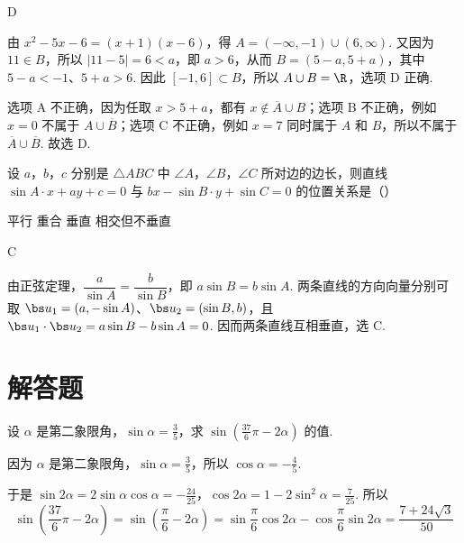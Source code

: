 \begin{answer}
D
\end{answer}

\begin{solution}
由 \(x^2-5x-6=(x+1)(x-6)\)，得 \(A=(-\infty,-1)\cup(6,\infty)\). 又因为 \(11\in B\)，所以 \(|11-5|=6<a\)，即 \(a>6\)，从而 \(B=(5-a,5+a)\)，其中 \(5-a<-1\)、\(5+a>6\). 因此 \([-1,6]\subset B\)，所以 \(A\cup B=\R\)，选项 D 正确.

选项 A 不正确，因为任取 \(x>5+a\)，都有 \(x\notin\overline A\cup B\)；选项 B 不正确，例如 \(x=0\) 不属于 \(A\cup\overline B\)；选项 C 不正确，例如 \(x=7\) 同时属于 \(A\) 和 \(B\)，所以不属于 \(\overline A\cup\overline B\). 故选 D.
\end{solution}

\begin{problem}
设 \(a\)，\(b\)，\(c\) 分别是 \(\triangle ABC\) 中 \(\angle A\)，\(\angle B\)，\(\angle C\) 所对边的边长，则直线 \(\sin A \cdot x + ay + c = 0\) 与 \(bx - \sin B \cdot y + \sin C = 0\) 的位置关系是（\quad）

\choices
    {平行}
    {重合}
    {垂直}
    {相交但不垂直}
\end{problem}

\begin{answer}
C
\end{answer}

\begin{solution}
由正弦定理，\(\dfrac{a}{\sin A}=\dfrac{b}{\sin B}\)，即 \(a\sin B=b\sin A\). 两条直线的方向向量分别可取 \(\bs u_1=(a,-\sin A)\)、\(\bs u_2=(\sin B,b)\)，且 \(\bs u_1\cdot\bs u_2=a\sin B-b\sin A=0\). 因而两条直线互相垂直，选 C.
\end{solution}

\section{解答题}

\begin{problem}
设 \(\alpha\) 是第二象限角，\(\sin \alpha = \frac{3}{5}\)，求 \(\sin \left(\frac{37}{6} \pi - 2\alpha\right)\) 的值.
\end{problem}

\begin{solution}
因为 \(\alpha\) 是第二象限角，\(\sin\alpha=\frac{3}{5}\)，所以 \(\cos\alpha=-\frac{4}{5}\).

于是 \(\sin2\alpha=2\sin\alpha\cos\alpha=-\frac{24}{25}\)，\(\cos2\alpha=1-2\sin^2\alpha=\frac{7}{25}\).
所以
\[
\sin\left(\frac{37}{6}\pi-2\alpha\right)
=\sin\left(\frac{\pi}{6}-2\alpha\right)
=\sin\frac{\pi}{6}\cos2\alpha-\cos\frac{\pi}{6}\sin2\alpha
=\frac{7+24\sqrt{3}}{50}
\]
\end{solution}


